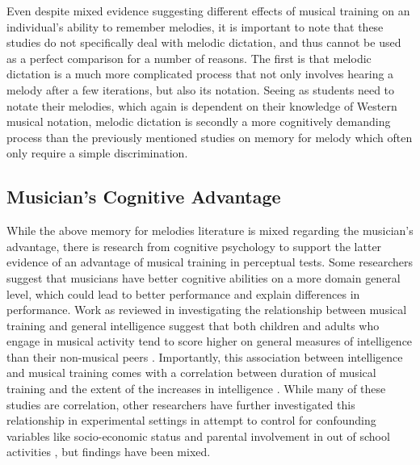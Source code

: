 \documentclass[]{book}
\begin{document}
Even despite mixed evidence suggesting different effects of musical training on an individual's ability to remember melodies, it is important to note that these studies do not specifically deal with melodic dictation, and thus cannot be used as a perfect comparison for a number of reasons.
The first is that melodic dictation is a much more complicated process that not only involves hearing a melody after a few iterations, but also its notation.
Seeing as students need to notate their melodies, which again is dependent on their knowledge of Western musical notation, melodic dictation is secondly a more cognitively demanding process than the previously mentioned studies on memory for melody which often only require a simple discrimination.

\hypertarget{musicians-cognitive-advantage}{%
\subsection{Musician's Cognitive Advantage}\label{musicians-cognitive-advantage}}

While the above memory for melodies literature is mixed regarding the musician's advantage, there is research from cognitive psychology to support the latter evidence of an advantage of musical training in perceptual tests.
Some researchers suggest that musicians have better cognitive abilities on a more domain general level, which could lead to better performance and explain differences in performance.
Work as reviewed in \citet{schellenbergMusicNonmusicalAbilities2017} investigating the relationship between musical training and general intelligence suggest that both children and adults who engage in musical activity tend to score higher on general measures of intelligence than their non-musical peers \citep{gibsonEnhancedDivergentThinking2009, hilleAssociationsMusicEducation2011, schellenbergExaminingAssociationMusic2011, schellenbergMusicTrainingEmotion2012}.
Importantly, this association between intelligence and musical training comes with a correlation between duration of musical training and the extent of the increases in intelligence \citep{corrigallMusicTrainingCognition2013, corrigallPredictingWhoTakes2015, degeMusicLessonsIntelligence2011, schellenbergLongtermPositiveAssociations2006}.
While many of these studies are correlation, other researchers have further investigated this relationship in experimental settings in attempt to control for confounding variables like socio-economic status and parental involvement in out of school activities \citep{corrigallMusicTrainingCognition2013, degeMusicLessonsIntelligence2011, schellenbergExaminingAssociationMusic2011, schellenbergLongtermPositiveAssociations2006, schellenbergMusicTrainingEmotion2012}, but findings have been mixed.
\end{document}
